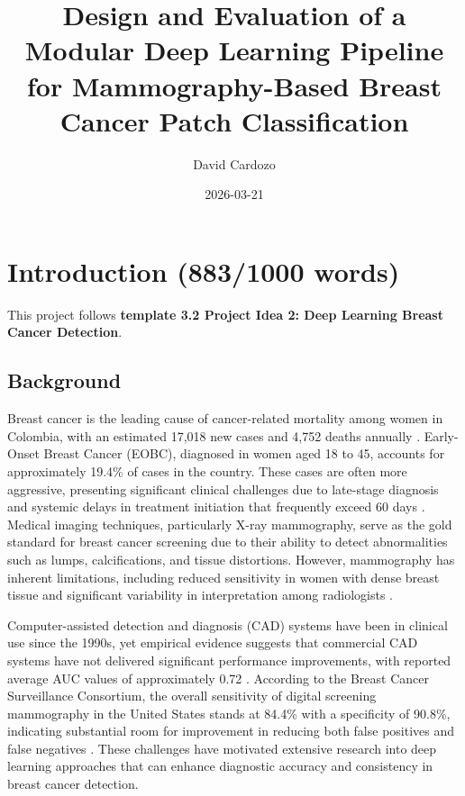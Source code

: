 \documentclass[justified,notoc,openany]{tufte-book}
\title{Design and Evaluation of a Modular Deep Learning Pipeline for Mammography-Based Breast Cancer Patch Classification}
\author{David Cardozo}
\date{2026-03-21}
\begin{document}
\raggedbottom



\tableofcontents

\chapter{Introduction (883/1000 words)}\label{introduction-8831000-words}

This project follows \textbf{template 3.2 Project Idea 2: Deep Learning Breast Cancer Detection}.

\section{Background}\label{background}

Breast cancer is the leading cause of cancer-related mortality among women in Colombia, with an estimated 17,018 new cases and 4,752 deaths annually \cite{ValbuenaGarcia2025}. Early-Onset Breast Cancer (EOBC), diagnosed in women aged 18 to 45, accounts for approximately 19.4\% of cases in the country. These cases are often more aggressive, presenting significant clinical challenges due to late-stage diagnosis and systemic delays in treatment initiation that frequently exceed 60 days \cite{ValbuenaGarcia2025}. Medical imaging techniques, particularly X-ray mammography, serve as the gold standard for breast cancer screening due to their ability to detect abnormalities such as lumps, calcifications, and tissue distortions. However, mammography has inherent limitations, including reduced sensitivity in women with dense breast tissue and significant variability in interpretation among radiologists \cite{Wang2024}.

Computer-assisted detection and diagnosis (CAD) systems have been in clinical use since the 1990s, yet empirical evidence suggests that commercial CAD systems have not delivered significant performance improvements, with reported average AUC values of approximately 0.72 \cite{Carriero2024}. According to the Breast Cancer Surveillance Consortium, the overall sensitivity of digital screening mammography in the United States stands at 84.4\% with a specificity of 90.8\%, indicating substantial room for improvement in reducing both false positives and false negatives \cite{Carriero2024}. These challenges have motivated extensive research into deep learning approaches that can enhance diagnostic accuracy and consistency in breast cancer detection.
\end{document}
